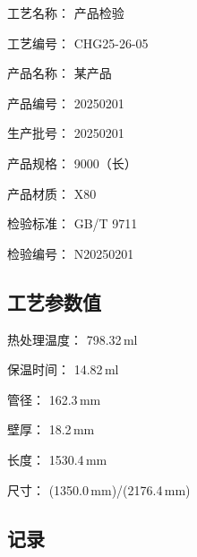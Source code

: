 \documentclass[UTF8,10pt,a4paper,fontset=fandol]{ctexart}
\newcommand{\fieldvalue}[1]{#1}
\begin{document}
工艺名称：
\fieldvalue{产品检验}

工艺编号：
\fieldvalue{CHG25-26-05}

产品名称：
\fieldvalue{某产品}

产品编号：
\fieldvalue{20250201}

生产批号：
\fieldvalue{20250201}

产品规格：
\fieldvalue{9000（长）}

产品材质：
\fieldvalue{X80}

检验标准：
\fieldvalue{GB/T 9711}

检验编号：
\fieldvalue{N20250201}

\subsection*{工艺参数值}

热处理温度：
\fieldvalue{798.32\,ml}

保温时间：
\fieldvalue{14.82\,ml}

管径：
\fieldvalue{162.3\,mm}

壁厚：
\fieldvalue{18.2\,mm}

长度：
\fieldvalue{1530.4\,mm}

尺寸：
\fieldvalue{(1350.0\,mm)/(2176.4\,mm)}

\subsection*{记录}
\end{document}
